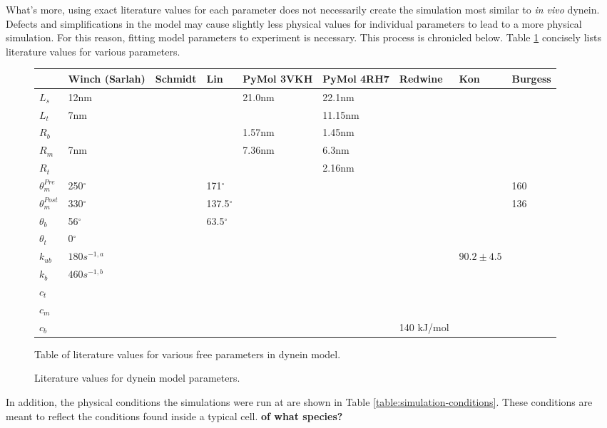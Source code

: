 \documentclass[10pt]{article} %
\begin{document}
What's more, using exact literature values for each parameter does not necessarily create the simulation most similar to \textit{in vivo} dynein. Defects and simplifications in the model may cause slightly less physical values for individual parameters to lead to a more physical simulation. For this reason, fitting model parameters to experiment is necessary. This process is chronicled below. Table \ref{table:parameter-table} concisely lists literature values for various parameters.

\begin{figure}[h]
  \centering
  \begin{tabular}{| l | l | l | l | l | l | l | l | l |}
    \hline
    & Winch (Sarlah) & Schmidt & Lin & PyMol 3VKH & PyMol 4RH7 & Redwine & Kon & Burgess \\\hline
    $L_s$ & 12nm & & & 21.0nm & 22.1nm & & & \\ \hline
    $L_t$ &  7nm & & & & 11.15nm & & & \\ \hline
    $R_b$ &  & & & 1.57nm & 1.45nm & & & \\ \hline
    $R_m$ &  7nm & & & 7.36nm & 6.3nm & & & \\ \hline
    $R_t$ &  & & & & 2.16nm & & & \\ \hline
    $\theta_{m}^{Pre}$ & 250$^{\circ}$ & & 171$^{\circ}$ & & & & & 160\\ \hline
    $\theta_{m}^{Post}$ & 330$^{\circ}$ & & 137.5$^{\circ}$ & & & & & 136\\ \hline
    $\theta_{b}$ & 56$^{\circ}$ & & 63.5$^{\circ}$ & & & & & \\ \hline
    $\theta_{t}$ & 0$^{\circ}$ & & & & & & & \\ \hline
    $k_{ub}$ & $180 s^{-1,a}$ & & & & & & $90.2 \pm 4.5$& \\ \hline
    $k_b$ & $460 s^{-1,b}$ & & & & & & & \\ \hline
    $c_t$ & & & & & & & & \\ \hline
    $c_m$ & & & & & & & & \\ \hline
    $c_b$ & & & & & & 140 kJ/mol & & \\ \hline
  \end{tabular}
  \caption{Literature values for dynein model parameters.}{Table of literature values for various free parameters in dynein model.}
  \label{table:parameter-table}
\end{figure}

In addition, the physical conditions the simulations were run at are shown in Table \ref{table:simulation-conditions}. These conditions are meant to reflect the conditions found inside a typical cell. \textbf{of what species?}\\
\end{document}
